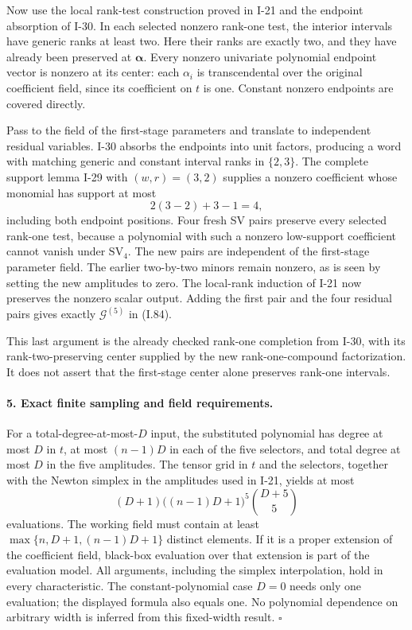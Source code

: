 Now use the local rank-test construction proved in I-21 and
the endpoint absorption of I-30. In each selected nonzero
rank-one test, the interior intervals have generic ranks at
least two. Here their ranks are exactly two, and they have
already been preserved at $\boldsymbol\alpha$. Every nonzero
univariate polynomial endpoint vector is nonzero at its center:
each $\alpha_i$ is transcendental over the original coefficient
field, since its coefficient on $t$ is one. Constant nonzero
endpoints are covered directly.

Pass to the field of the first-stage parameters and translate
to independent residual variables. I-30 absorbs the endpoints
into unit factors, producing a word with matching generic and
constant interval ranks in $\{2,3\}$. The complete support
lemma I-29 with $(w,r)=(3,2)$ supplies a nonzero coefficient
whose monomial has support at most
\[
 2(3-2)+3-1=4,
 \tag{I.88}
\]
including both endpoint positions. Four fresh SV pairs preserve
every selected rank-one test, because a polynomial with such a
nonzero low-support coefficient cannot vanish under $\mathrm{SV}_4$.
The new pairs are independent of the first-stage parameter field.
The earlier two-by-two minors remain nonzero, as is seen by setting
the new amplitudes to zero. The local-rank induction of I-21 now
preserves the nonzero scalar output. Adding the first pair and
the four residual pairs gives exactly $\mathcal G^{(5)}$ in (I.84).

This last argument is the already checked rank-one completion
from I-30, with its rank-two-preserving center supplied by the
new rank-one-compound factorization. It does not assert that
the first-stage center alone preserves rank-one intervals.

\paragraph{5. Exact finite sampling and field requirements.}
For a total-degree-at-most-$D$ input, the substituted polynomial
has degree at most $D$ in $t$, at most $(n-1)D$ in each of the
five selectors, and total degree at most $D$ in the five
amplitudes. The tensor grid in $t$ and the selectors, together
with the Newton simplex in the amplitudes used in I-21, yields
at most
\[
 (D+1)\bigl((n-1)D+1\bigr)^5\binom{D+5}{5}
 \tag{I.89}
\]
evaluations. The working field must contain at least
$\max\{n,D+1,(n-1)D+1\}$ distinct elements. If it is a proper
extension of the coefficient field, black-box evaluation over
that extension is part of the evaluation model. All arguments,
including the simplex interpolation, hold in every characteristic.
The constant-polynomial case $D=0$ needs only one evaluation;
the displayed formula also equals one. No polynomial dependence
on arbitrary width is inferred from this fixed-width result.
\hfill$\square$

